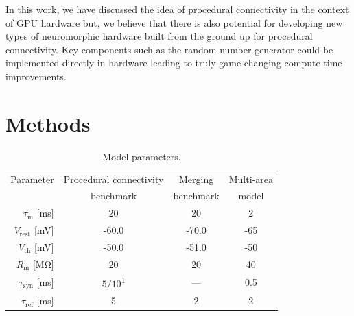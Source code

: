 \documentclass[9pt,a4paper]{amsart}
\begin{document}
In this work, we have discussed the idea of procedural connectivity in the context of GPU hardware but, we believe that there is also potential for developing new types of neuromorphic hardware built from the ground up for procedural connectivity.
Key components such as the random number generator could be implemented directly in hardware leading to truly game-changing compute time improvements.
%
\section{Methods}
\begin{table}
  \centering
  \begin{tabular}{r S S S}
    \toprule
        {Parameter}                             & {Procedural connectivity} & {Merging}         & {Multi-area} \\
                                                & {benchmark}               & {benchmark}       & {model} \\
    \midrule
        $\tau_{\text{m}}$ [\si{\milli\second}]         & 20                        & 20                & 2 \\
        $V_{\text{rest}}$ [\si{\milli\volt}]           & -60.0                     & -70.0             & -65 \\
       
        $V_{\text{th}}$ [\si{\milli\volt}]         & -50.0                     & -51.0             & -50 \\
        $R_{\text{m}}$ [\si{\mega\ohm}]                  & 20                        & 20                & 40 \\
        $\tau_{\text{syn}}$ [\si{\milli\second}]       & {$5/10$\textsuperscript{1}} & {---}             & 0.5\\
        $\tau_{\text{ref}}$ [\si{\milli\second}]       & 5                         & 2                 & 2 \\
    \bottomrule
  \end{tabular}
  \caption{Model parameters.}
  \label{tab:parameters}
\end{table}
\end{document}
